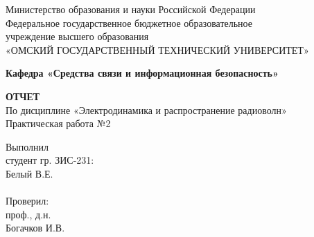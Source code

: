 \documentclass[14pt,a4paper]{scrartcl}
\begin{document}
  \begin{titlepage}                                                         
    \newpage                                                                        
    \begin{center}   
      Министерство образования и науки Российской Федерации  \\ 
      \vspace{1em}                                                    
      {\mdseries
        Федеральное государственное бюджетное образовательное \\
        учреждение высшего образования \\
        «ОМСКИЙ ГОСУДАРСТВЕННЫЙ ТЕХНИЧЕСКИЙ УНИВЕРСИТЕТ»
      }                               
      \vspace{1em}      

      {\bfseries Кафедра «Средства связи и информационная безопасность»}  

      \vspace{\fill}                                                         
                                   
      {\bfseries ОТЧЕТ } \\                                 
      По дисциплине «Электродинамика и распространение радиоволн» \\ 
      \vspace{1em} 
      Практическая работа №2 \\                                                           
    \end{center}                                                          
                                                                                        
    \vspace{\fill}                                                         
                                                                                        
    \hfill\parbox{5cm}{
      Выполнил\\
      студент гр. ЗИС-231:\\
      Белый В.Е. \\
      \\
      Проверил:\\
      проф., д.н. \\
      Богачков И.В.\\
    }                                                                                                                              
                                                                                                                                                                              

\end{titlepage}
\end{document}
